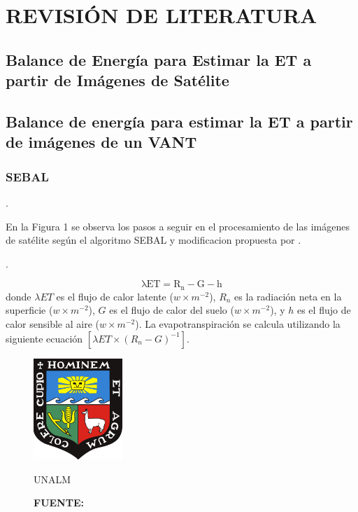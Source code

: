 \chapter{REVISIÓN DE LITERATURA}
\thispagestyle{empty}
\section{Balance de Energía para Estimar la ET a partir de Imágenes de Satélite }

\lipsum[1]

\lipsum[2]

\section{Balance de energía para estimar la ET a partir de imágenes de un VANT}

\lipsum[1]

\lipsum[2]

\subsection{SEBAL}

\lipsum[1]

\lipsum[2] \parencite{Lee2016}.

En la Figura 1 se observa los pasos a seguir en el procesamiento de las imágenes de satélite según el algoritmo SEBAL y modificacion propuesta por \parencite{Lee2016}. 

\lipsum[3] \parencite{Lee2016}.

\begin{equation}
   \mathrm{ \lambda  ET = R_{n} - G - h}
\end{equation}
donde $\lambda ET$ es el flujo de calor latente ($w\times m^{-2}$), $R_{n}$ es la radiación neta en la superficie ($w\times m^{-2}$), $G$ es el flujo de calor del suelo ($w\times m^{-2}$), y $h$ es el flujo de calor sensible al aire ($w\times m^{-2}$). La evapotranspiración se calcula utilizando la siguiente ecuación $\left [\lambda ET\times \left ( R_{n} - G \right )^{-1} \right]$.

\begin{figure}[htbp!]
    \centering
    \includegraphics[width=0.3\textwidth]{Cover/Escudo_UNALM.pdf}
    \caption{UNALM}
    \captionsetup{labelfont=rm,skip=2pt,textfont=rm,font=small}
        \caption*{\textbf{FUENTE:} \parencite{Lee2016}}
    \label{fig:1}
\end{figure}

